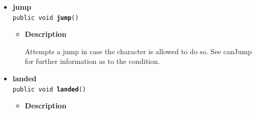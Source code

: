 \documentclass[11pt,a4paper]{report}
\begin{document}
{{{{{{{{{{{\begin{itemize}
{\begin{itemize}
{returns if retroman has already picked up an elemnt
}
\item{{\bf  Returns} -- 
true if the retroman currently holds a gameelement; false otherwise 
}%
\end{itemize}
}%
\item{ 
{\bf  jump}\\
\texttt{public void\ {\bf  jump}()
\label{com.retroMachines.game.gameelements.RetroMan.jump()}}%
\begin{itemize}
\item{
{\bf  Description}

Attempts a jump in case the character is allowed to do so. See canJump for further information as to the condition.
}
\end{itemize}
}%
\item{ 
{\bf  landed}\\
\texttt{public void\ {\bf  landed}()
\label{com.retroMachines.game.gameelements.RetroMan.landed()}}%
\begin{itemize}
\item{
{\bf  Description}

}
\end{itemize}}
\end{itemize}}}}}}}}}}}}
\end{document}
